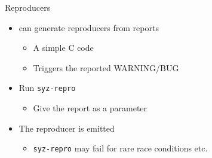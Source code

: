 \begin{frame}{\syz}{Reproducers}

  \begin{itemize}
    \item \syz can generate reproducers from reports
    \begin{itemize}
      \item A simple C code
      \item Triggers the reported WARNING/BUG
    \end{itemize}

    \pause

    \item Run \texttt{syz-repro}
    \begin{itemize}
      \item Give the report as a parameter
    \end{itemize}

    \pause

    \item The reproducer is emitted
    \begin{itemize}
      \item \texttt{syz-repro} may fail for rare race conditions etc.
    \end{itemize}
  \end{itemize}

\end{frame}


